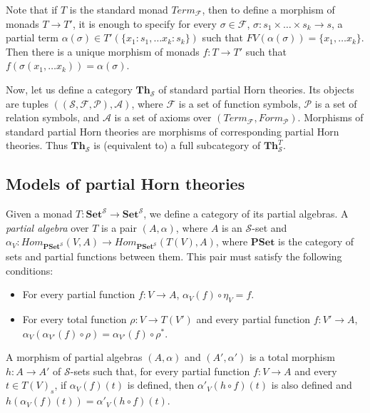 \documentclass[reqno]{amsart}
\theoremstyle{definition}
\theoremstyle{remark}
\newcommand{\cat}[1]{\mathbf{#1}}
\newcommand{\Set}{\cat{Set}}
\newcommand{\PSet}{\cat{PSet}}
\newcommand{\Th}{\cat{Th}}
\numberwithin{figure}{section}
\begin{document}
Note that if $T$ is the standard monad $Term_\mathcal{F}$, then to define a morphism of monads $T \to T'$,
    it is enough to specify for every $\sigma \in \mathcal{F}$, $\sigma : s_1 \times \ldots \times s_k \to s$,
    a partial term $\alpha(\sigma) \in T'(\{ x_1 : s_1, \ldots x_k : s_k \})$ such that $FV(\alpha(\sigma)) = \{ x_1, \ldots x_k \}$.
Then there is a unique morphism of monads $f : T \to T'$ such that $f(\sigma(x_1, \ldots x_k)) = \alpha(\sigma)$.

Now, let us define a category $\Th_\mathcal{S}$ of standard partial Horn theories.
Its objects are tuples $((\mathcal{S},\mathcal{F},\mathcal{P}),\mathcal{A})$, where $\mathcal{F}$ is a set of function symbols,
    $\mathcal{P}$ is a set of relation symbols, and $\mathcal{A}$ is a set of axioms over $(Term_\mathcal{F},Form_\mathcal{P})$.
Morphisms of standard partial Horn theories are morphisms of corresponding partial Horn theories.
Thus $\Th_\mathcal{S}$ is (equivalent to) a full subcategory of $\Th^T_\mathcal{S}$.

\subsection{Models of partial Horn theories}

Given a monad $T : \Set^\mathcal{S} \to \Set^\mathcal{S}$, we define a category of its partial algebras.
A \emph{partial algebra} over $T$ is a pair $(A,\alpha)$, where $A$ is an $\mathcal{S}$-set and $\alpha_V : Hom_{\PSet^\mathcal{S}}(V,A) \to Hom_{\PSet^\mathcal{S}}(T(V),A)$,
    where $\PSet$ is the category of sets and partial functions between them.
This pair must satisfy the following conditions:
\begin{itemize}
\item For every partial function $f : V \to A$, $\alpha_V(f) \circ \eta_V = f$.
\item For every total function $\rho : V \to T(V')$ and every partial function $f : V' \to A$, $\alpha_V(\alpha_{V'}(f) \circ \rho) = \alpha_{V'}(f) \circ \rho^*$.
\end{itemize}
A morphism of partial algebras $(A,\alpha)$ and $(A',\alpha')$ is a total morphism $h : A \to A'$ of $\mathcal{S}$-sets
    such that, for every partial function $f : V \to A$ and every $t \in T(V)_s$, if $\alpha_V(f)(t)$ is defined,
    then $\alpha'_V(h \circ f)(t)$ is also defined and $h(\alpha_V(f)(t)) = \alpha'_V(h \circ f)(t)$.
\end{document}
